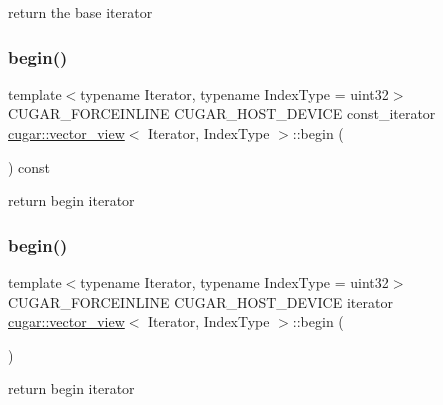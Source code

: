 return the base iterator \mbox{\label{structcugar_1_1vector__view_a20919196546a2644a43b3298d7da67ce}} 
\subsubsection{\texorpdfstring{begin()}{begin()}\hspace{0.1cm}{\footnotesize\ttfamily [1/2]}}
{\footnotesize\ttfamily template$<$typename Iterator, typename Index\+Type = uint32$>$ \\
C\+U\+G\+A\+R\+\_\+\+F\+O\+R\+C\+E\+I\+N\+L\+I\+NE C\+U\+G\+A\+R\+\_\+\+H\+O\+S\+T\+\_\+\+D\+E\+V\+I\+CE const\+\_\+iterator \hyperlink{structcugar_1_1vector__view}{cugar\+::vector\+\_\+view}$<$ Iterator, Index\+Type $>$\+::begin (\begin{DoxyParamCaption}{ }\end{DoxyParamCaption}) const\hspace{0.3cm}{\ttfamily [inline]}}

return begin iterator \mbox{\label{structcugar_1_1vector__view_a5067c45d339f1062d3dceef8135d2d2a}} 
\subsubsection{\texorpdfstring{begin()}{begin()}\hspace{0.1cm}{\footnotesize\ttfamily [2/2]}}
{\footnotesize\ttfamily template$<$typename Iterator, typename Index\+Type = uint32$>$ \\
C\+U\+G\+A\+R\+\_\+\+F\+O\+R\+C\+E\+I\+N\+L\+I\+NE C\+U\+G\+A\+R\+\_\+\+H\+O\+S\+T\+\_\+\+D\+E\+V\+I\+CE iterator \hyperlink{structcugar_1_1vector__view}{cugar\+::vector\+\_\+view}$<$ Iterator, Index\+Type $>$\+::begin (\begin{DoxyParamCaption}{ }\end{DoxyParamCaption})\hspace{0.3cm}{\ttfamily [inline]}}

return begin iterator \mbox{\label{structcugar_1_1vector__view_a46b9be216230954a48e42cda236d7fcd}} 
